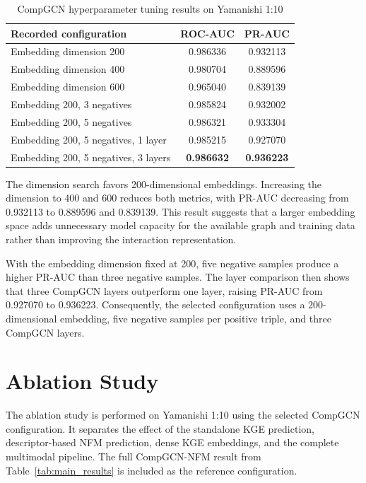 \begin{table}[H]
\centering
\caption{CompGCN hyperparameter tuning results on Yamanishi 1:10}
\label{tab:compgcn_tuning}
\small
\begin{tabularx}{\textwidth}{Xcc}
\toprule
\textbf{Recorded configuration} & \textbf{ROC-AUC} & \textbf{PR-AUC} \\
\midrule
Embedding dimension 200 & 0.986336 & 0.932113 \\
Embedding dimension 400 & 0.980704 & 0.889596 \\
Embedding dimension 600 & 0.965040 & 0.839139 \\
Embedding 200, 3 negatives & 0.985824 & 0.932002 \\
Embedding 200, 5 negatives & 0.986321 & 0.933304 \\
Embedding 200, 5 negatives, 1 layer & 0.985215 & 0.927070 \\
Embedding 200, 5 negatives, 3 layers & \textbf{0.986632} & \textbf{0.936223} \\
\bottomrule
\end{tabularx}
\end{table}

The dimension search favors 200-dimensional embeddings. Increasing the
dimension to 400 and 600 reduces both metrics, with PR-AUC decreasing from
0.932113 to 0.889596 and 0.839139. This result suggests that a larger embedding
space adds unnecessary model capacity for the available graph and training
data rather than improving the interaction representation.

With the embedding dimension fixed at 200, five negative samples produce a
higher PR-AUC than three negative samples. The layer comparison then shows that
three CompGCN layers outperform one layer, raising PR-AUC from 0.927070 to
0.936223. Consequently, the selected configuration uses a 200-dimensional
embedding, five negative samples per positive triple, and three CompGCN layers.

\section{Ablation Study}
\label{sec:ablation_study}

The ablation study is performed on Yamanishi 1:10 using the selected CompGCN
configuration. It separates the effect of the standalone KGE prediction,
descriptor-based NFM prediction, dense KGE embeddings, and the complete
multimodal pipeline. The full CompGCN-NFM result from
Table~\ref{tab:main_results} is included as the reference configuration.

